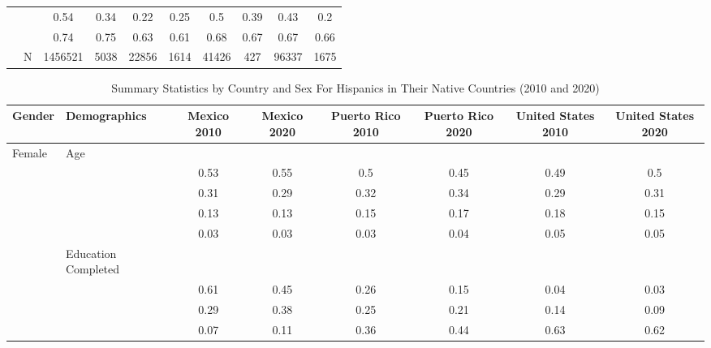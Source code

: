 \documentclass[
]{article}
\begin{document}
\begin{landscape}
\begin{table}[ht]
\begin{tabular}{l>{\raggedright\arraybackslash}p{3.2cm}|cccccccc}
   & \multicolumn{1}{>{\raggedleft\arraybackslash}p{2.9cm}|}{\makebox[2.9cm][r]{Lives with Child }} & 0.54 & 0.34 & 0.22 & 0.25 & 0.5 & 0.39 & 0.43 & 0.2 \\ 
   & \multicolumn{1}{>{\raggedleft\arraybackslash}p{3.4cm}|}{\makebox[3.4cm][r]{Married/Cohabiting }} & 0.74 & 0.75 & 0.63 & 0.61 & 0.68 & 0.67 & 0.67 & 0.66 \\ 
   & N & 1456521 & 5038 & 22856 & 1614 & 41426 & 427 & 96337 & 1675 \\ 
   \hline
\end{tabular}
\endgroup
\end{table}


\begin{table}[ht]
\centering
\caption{Summary Statistics by Country and Sex For Hispanics in Their Native Countries (2010 and 2020)} 
\begingroup\small
\begin{tabular}{l>{\raggedright\arraybackslash}p{3.2cm}|cccccc}
  \hline
Gender & Demographics & Mexico 2010 & Mexico 2020 & Puerto Rico 2010 & Puerto Rico 2020 & United States 2010 & United States 2020 \\ 
  \hline
Female & Age &  &  &  &  &  &  \\ 
   & \multicolumn{1}{>{\raggedleft\arraybackslash}p{1.5cm}|}{\makebox[1.5cm][r]{60 - 69 }} & 0.53 & 0.55 & 0.5 & 0.45 & 0.49 & 0.5 \\ 
   & \multicolumn{1}{>{\raggedleft\arraybackslash}p{1.5cm}|}{\makebox[1.5cm][r]{70 - 79 }} & 0.31 & 0.29 & 0.32 & 0.34 & 0.29 & 0.31 \\ 
   & \multicolumn{1}{>{\raggedleft\arraybackslash}p{1.5cm}|}{\makebox[1.5cm][r]{80 - 89 }} & 0.13 & 0.13 & 0.15 & 0.17 & 0.18 & 0.15 \\ 
   & \multicolumn{1}{>{\raggedleft\arraybackslash}p{1.5cm}|}{\makebox[1.5cm][r]{90 plus }} & 0.03 & 0.03 & 0.03 & 0.04 & 0.05 & 0.05 \\ 
   & Education Completed &  &  &  &  &  &  \\ 
   & \multicolumn{1}{>{\raggedleft\arraybackslash}p{3.2cm}|}{\makebox[3.2cm][r]{Less than Primary }} & 0.61 & 0.45 & 0.26 & 0.15 & 0.04 & 0.03 \\ 
   & \multicolumn{1}{>{\raggedleft\arraybackslash}p{1.7cm}|}{\makebox[1.7cm][r]{Primary }} & 0.29 & 0.38 & 0.25 & 0.21 & 0.14 & 0.09 \\ 
   & \multicolumn{1}{>{\raggedleft\arraybackslash}p{2cm}|}{\makebox[2cm][r]{Secondary }} & 0.07 & 0.11 & 0.36 & 0.44 & 0.63 & 0.62 \\ 

\end{tabular}
\end{table}
\end{landscape}
\end{document}
